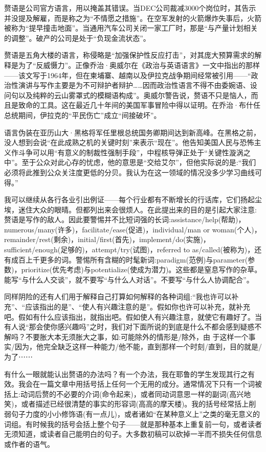 赘语是公司官方语言，用以掩盖其错误。当DEC公司裁减3000个岗位时，其告示并没提及解雇，而是称之为“不情愿之措施”。在空军发射的火箭爆炸失事后，火箭被称为“提早撞击地面”。当通用汽车公司关闭一家工厂时，那是“与产量计划相关的调整”。破产的公司是处于“负现金流状态”。

赘语是五角大楼的语言，称侵略是“加强保护性反应打击”，对其庞大预算需求的解释是为了“反威慑力”。正像乔治·奥威尔在《政治与英语语言》一文中指出的那样——该文写于1964年，但在柬埔寨、越南以及伊拉克战争期间经常被引用——“政治性演讲与写作主要是为不可辩护者辩护……因而政治性语言不得不由委婉语、设问句以及纯粹的云山雾罩式的模糊语构成”。奥威尔警告说，赘语不只是恼人，而且是致命的工具。这在最近几十年间的美国军事冒险中得以证明。在乔治·布什任总统期间，伊拉克的“平民伤亡”成立“间接破坏”。

语言伪装在亚历山大·黑格将军任里根总统国务卿期间达到新高峰。在黑格之前，没人想到会说“在此成熟之机的关键时刻”来表示“现在”。他告知美国人民与恐怖主义作斗争可以用“有意义的制裁性强制手段”，中程核导弹正处于“关键性漩涡之中”。至于公众对此心存的忧虑，他的意思是“交给艾尔”，但他实际说的是:“我们必须将此推到公众关注度更低的分贝。我认为在这一领域的情况没多少学习曲线可得。”

我可以继续从各行各业引出例证——每个行业都有不断增长的行话库，它们扬起尘埃，迷住大众的眼晴。但都列出来会很烦人。在此提出来的目的是引起大家注意:赘语是写作的敌人。因此要警惕并不比短词强的长词:assistance/help(帮助)，numerous/many(许多)，facilitate/ease(促进)，individual/man or woman(个人)，remainder/rest(剩余)，initial/first(首先)，implement/do(实施)，sufficient/enough(足够的)，attempt/try(试图)，referred to as/called(被称为)，还有成百上千更多的词。警惕所有含糊的时髦新词:paradigm(范例)与parameter(参数)，prioritize(优先考虑)与potentialize(使成为潜力)。这些都是窒息写作的杂草。能写“与什么人交谈”，就不要写“与什么人对话”。不要写“与什么人协调配合”。

同样阴险的还有人们用于解释自己打算如何解释的各种词组:“我也许可以补充”、“应该指出的是”、“使人有兴趣注意的是”。假如你也许可以补充，就补充吧。假如有什么应该指出，就指出吧。假如使人有兴趣注意，就使它有趣好了。当有人说“那会使你感兴趣吗”之时，我们对下面所说的到底是什么不都会感到疑惑不解吗？不要胀大本无须胀大之事，如:可能除外的情形是/除外，由 于这样一个事实/因为，他完全缺乏这样一种能力/他不能，直到那样一个时刻/直到，目的就是/为了⋯⋯

有什么一眼就能认出赘语的办法吗？有一个办法，我在耶鲁的学生发现其行之有效。我会在一篇文章中用括号括上任何一个无用的成分。通常情况下只有一个词被括上:动词后赘的不必要的介词(命令起来)，或者同动词意思一样的副词(高兴地笑)，或者描述已经很清楚的事实的形容词(高高的摩天楼)。我的括号经常括上削弱句子力度的小小修饰语(有一点儿)，或者诸如“在某种意义上”之类的毫无意义的词组。有时候我的括号会括上整个句子——就是那种基本上重复前一句，或者读者无须知道，或读者自己能明白的句子。大多数初稿可以砍掉一半而不损失任何信息或作者的语气。

